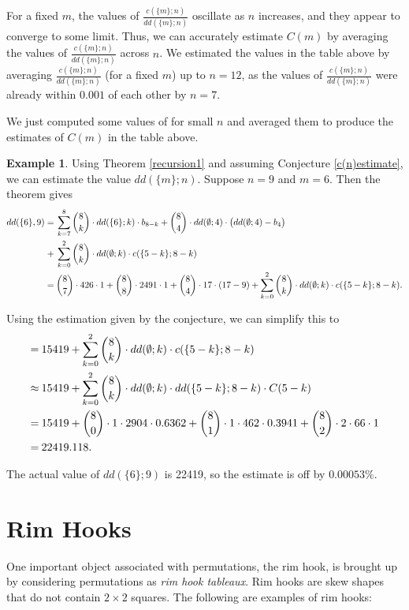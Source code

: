 \documentclass[11pt, a4paper, reqno]{article}
\numberwithin{equation}{section}
\newcommand{\s}{\hspace{0.08cm}}
\theoremstyle{definition}
\newtheorem{example}[theorem]{Example}
\begin{document}
	For a fixed $m$, the values of $\frac{c(\{m\}; n)}{dd(\{m\}; n)}$ oscillate as $n$ increases, and they appear to converge to some limit. Thus, we can accurately estimate $C(m)$ by averaging the values of $\frac{c(\{m\}; n)}{dd(\{m\}; n)}$ across $n$. We estimated the values in the table above by averaging $\frac{c(\{m\}; n)}{dd(\{m\}; n)}$ (for a fixed $m$) up to $n = 12$, as the values of $\frac{c(\{m\}; n)}{dd(\{m\}; n)}$ were already within $0.001$ of each other by $n=7$.
	
	We just computed some values of  for small $n$ and averaged them to produce the estimates of $C(m)$ in the table above.
	
	\begin{example}
		Using Theorem \ref{recursion1} and assuming Conjecture \ref{c(n)estimate}, we can estimate the value $dd(\{m\}; n)$. Suppose $n=9$ and $m=6$. Then the theorem gives 
		\begin{align*}
		dd(\{6\}, 9) = & \s \sum_{k=7}^8\dbinom{8}{k}\cdot dd(\{6\}; k)\cdot b_{8-k} + \dbinom{8}{4}\cdot dd(\emptyset;4)\cdot\big(dd(\emptyset;4)-b_4\big)\\
		+ & \s \sum_{k=0}^2\dbinom{8}{k}\cdot dd(\emptyset;k)\cdot c(\{5-k\};8-k) \\ = & \s \dbinom{8}{7}\cdot 426 \cdot 1 + \dbinom{8}{8}\cdot 2491\cdot 1 + \dbinom{8}{4}\cdot17\cdot(17-9) + \sum_{k=0}^2\dbinom{8}{k}\cdot dd(\emptyset;k)\cdot c(\{5-k\};8-k).
		\end{align*}
	\end{example}
	
	Using the estimation given by the conjecture, we can simplify this to
	\begin{align*}
	= & \s 15419 + \sum_{k=0}^2\dbinom{8}{k}\cdot dd(\emptyset;k)\cdot c(\{5-k\};8-k) \\ \approx &\s 15419 + \sum_{k=0}^2\dbinom{8}{k}\cdot dd(\emptyset;k)\cdot dd(\{5-k\}; 8-k) \cdot C(5-k) \\ = & \s 15419 + \dbinom{8}{0} \cdot 1 \cdot 2904 \cdot 0.6362 + \dbinom{8}{1} \cdot 1 \cdot 462 \cdot 0.3941 + \dbinom{8}{2} \cdot 2 \cdot 66 \cdot 1 \\ = & \s 22419.118.
	\end{align*}
	
	The actual value of $dd(\{6\}; 9)$ is 22419, so the estimate is off by $0.00053\%$. 
	
	\section{Rim Hooks}\label{rimhooks}
	 One important object associated with permutations, the rim hook, is brought up by considering permutations as \textit{rim hook tableaux}. Rim hooks are skew shapes that do not contain $2 \times 2$ squares. The following are examples of rim hooks:
	\vspace{0.3cm}
	\begin{center}
	     \hspace{1cm}  \hspace{1cm}
	 \hspace{1cm} 
	\end{center}
	\vspace{0.3cm}
	
\end{document}
